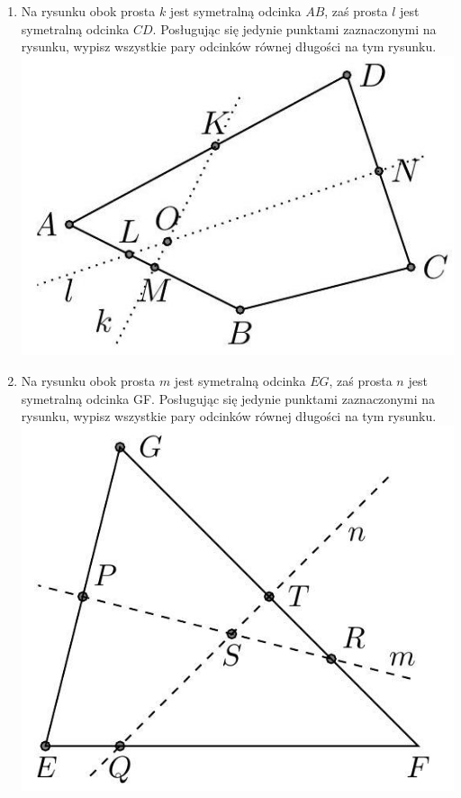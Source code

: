 \documentclass[10pt]{article}
\begin{document}
\begin{enumerate}
  \item Na rysunku obok prosta \(k\) jest symetralną odcinka \(A B\), zaś prosta \(l\) jest symetralną odcinka \(C D\). Posługując się jedynie punktami zaznaczonymi na rysunku, wypisz wszystkie pary odcinków równej długości na tym rysunku.\\
\includegraphics[max width=\textwidth, center]{2024_11_21_71f62bd117d375398909g-152(1)}
  \item Na rysunku obok prosta \(m\) jest symetralną odcinka \(E G\), zaś prosta \(n\) jest symetralną odcinka GF. Posługując się jedynie punktami zaznaczonymi na rysunku, wypisz wszystkie pary odcinków równej długości na tym rysunku.\\
\includegraphics[max width=\textwidth, center]{2024_11_21_71f62bd117d375398909g-152}
\end{enumerate}
\end{document}
